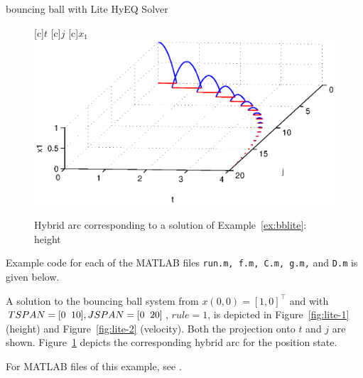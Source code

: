 \begin{example}{bouncing ball with Lite HyEQ Solver}
\begin{figure}[ht]
  \begin{center}
  [c]{$t$}
  [c]{$j$}
  [c]{$x_1$}
    \includegraphics[width=.8\textwidth]{figures/Examples/HybridArclite}
    \caption{Hybrid arc corresponding to a solution of Example~\ref{ex:bblite}: height
    }
    \label{fig:lite-3}
  \end{center}
\end{figure}

Example code for each of the MATLAB files {\tt run.m, f.m, C.m, g.m,} and {\tt D.m} is given below.\\



A solution to the bouncing ball system from 
$x(0,0)=[1,0]^\top$ and with 
$TSPAN = [0 \hspace{2mm} 10], JSPAN = [0 \hspace{2mm} 20]$, $rule =1$, 
is depicted in Figure~\ref{fig:lite-1} (height) 
and Figure~\ref{fig:lite-2} (velocity).  
Both the projection onto $t$ and $j$ are shown. 
Figure~\ref{fig:lite-3} depicts the corresponding hybrid arc for the position state.

For MATLAB files of this example, 
see .



\end{example}
